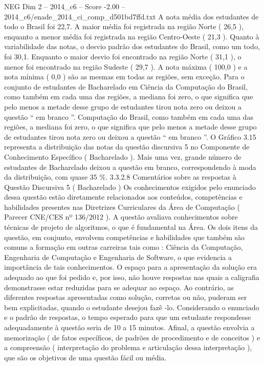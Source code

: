 \begin{textsample}{NEG Dim 2 – 2014\_c6 – Score -2.00 – 2014\_c6/enade\_2014\_ci\_comp\_d501bd7ffd.txt}
A nota média dos estudantes de todo o Brasil foi 22,7.
A maior média foi registrada na região Norte ( 26,5 ), enquanto a menor média foi registrada na região Centro-Oeste ( 21,3 ).
Quanto à variabilidade das notas, o desvio padrão dos estudantes do Brasil, como um todo, foi 30,1.
Enquanto o maior desvio foi encontrado na região Norte ( 31,1 ), o menor foi encontrado na região Sudeste ( 29,7 ).
A nota máxima ( 100,0 ) e a nota mínima ( 0,0 ) são as mesmas em todas as regiões, sem exceção.
Para o conjunto de estudantes de Bacharelado em Ciência da Computação do Brasil, como também em cada uma das regiões, a mediana foi zero, o que significa que pelo menos a metade desse grupo de estudantes tirou nota zero ou deixou a questão “ em branco ”.
Computação do Brasil, como também em cada uma das regiões, a mediana foi zero, o que significa que pelo menos a metade desse grupo de estudantes tirou nota zero ou deixou a questão “ em branco ”.
O Gráfico 3.15 representa a distribuição das notas da questão discursiva 5 no Componente de Conhecimento Específico ( Bacharelado ).
Mais uma vez, grande número de estudantes de Bacharelado deixou a questão em branco, correspondendo à moda da distribuição, com quase 35 \%. 3.3.2.8 Comentários sobre as respostas à Questão Discursiva 5 ( Bacharelado ) Os conhecimentos exigidos pelo enunciado dessa questão estão diretamente relacionados aos conteúdos, competências e habilidades presentes nas Diretrizes Curriculares da Área de Computação ( Parecer CNE/CES nº 136/2012 ).
A questão avaliava conhecimentos sobre técnicas de projeto de algoritmos, o que é fundamental na Área.
Os dois itens da questão, em conjunto, envolvem competências e habilidades que também são comuns a formação em outras carreiras tais como : Ciência da Computação, Engenharia de Computação e Engenharia de Software, o que evidencia a importância de tais conhecimentos.
O espaço para a apresentação da solução era adequado ao que foi pedido e, por isso, não houve respostas nas quais a caligrafia demonstrasse estar reduzidas para se adequar ao espaço.
Ao contrário, as diferentes respostas apresentadas como solução, corretas ou não, puderam ser bem explicitadas, quando o estudante desejou fazê -lo.
Considerando o enunciado e o padrão de respostas, o tempo esperado para que um estudante respondesse adequadamente à questão seria de 10 a 15 minutos.
Afinal, a questão envolvia a memorização ( de fatos específicos, de padrões de procedimento e de conceitos ) e a compreensão ( interpretação do problema e articulação dessa interpretação ), que são os objetivos de uma questão fácil ou média.

\end{textsample}
